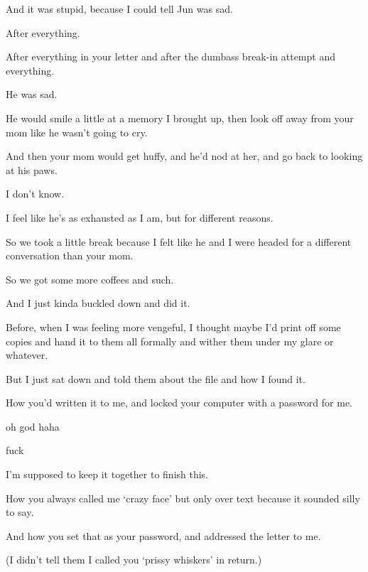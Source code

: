 { And it was stupid, because I could tell Jun was sad.

 After everything.

 After everything in your letter and after the dumbass break-in attempt and everything.

 He was sad.

 He would smile a little at a memory I brought up, then look off away from your mom like he wasn't going to cry.

 And then your mom would get huffy, and he'd nod at her, and go back to looking at his paws.

 I don't know.

 I feel like he's as exhausted as I am, but for different reasons.

 So we took a little break because I felt like he and I were headed for a different conversation than your mom.

 So we got some more coffees and such.

 And I just kinda buckled down and did it.

 Before, when I was feeling more vengeful, I thought maybe I'd print off some copies and hand it to them all formally and wither them under my glare or whatever.

 But I just sat down and told them about the file and how I found it.

 How you'd written it to me, and locked your computer with a password for me.

 oh god haha

 fuck

 I'm supposed to keep it together to finish this.

 How you always called me `crazy face' but only over text because it sounded silly to say.

 And how you set that as your password, and addressed the letter to me.

(I didn't tell them I called you
`prissy whiskers' in return.)

}
